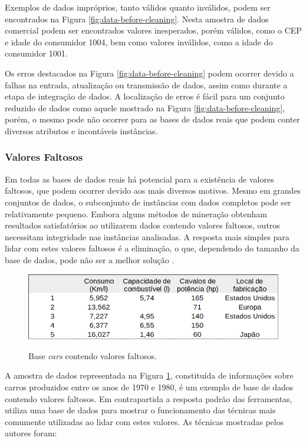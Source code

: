 Exemplos de dados impróprios, tanto válidos quanto inválidos, podem ser encontrados na Figura \ref{fig:data-before-cleaning}. Nesta amostra de dados comercial podem ser encontrados valores inesperados, porém válidos, como o CEP e idade do consumidor 1004, bem como valores inválidos, como a idade do consumidor 1001.

Os erros destacados na Figura \ref{fig:data-before-cleaning} podem ocorrer devido a falhas na entrada, atualização ou transmissão de dados, assim como durante a etapa de integração de dados. A localização de erros é fácil para um conjunto reduzido de dados como aquele mostrado na Figura \ref{fig:data-before-cleaning}, porém, o mesmo pode não ocorrer para as bases de dados reais que podem conter diversos atributos e incontáveis instâncias.

\subsubsection{Valores Faltosos}
\label{subsubsec:missing-values}

Em todas as bases de dados reais há potencial para a existência de valores faltosos, que podem ocorrer devido aos mais diversos motivos. Mesmo em grandes conjuntos de dados, o subconjunto de instâncias com dados completos pode ser relativamente pequeno. Embora alguns métodos de mineração obtenham resultados satisfatórios ao utilizarem dados contendo valores faltosos, outros necessitam integridade nas instâncias analisadas. A resposta mais simples para lidar com estes valores faltosos é a eliminação, o que, dependendo do tamanho da base de dados, pode não ser a melhor solução \cite{kantardzic2011data}.

\begin{figure}[H]
    \centering
    \caption{Base \textit{cars} contendo valores faltosos.}
    \includegraphics[width=\linewidth]{figuras/cars-missing-values.png}
    \label{fig:cars-missing-values}
\end{figure}

A amostra de dados representada na Figura \ref{fig:cars-missing-values}, constituída de informações sobre carros produzidos entre os anos de 1970 e 1980, é um exemplo de base de dados contendo valores faltosos. Em contrapartida a resposta padrão das ferramentas,  utiliza uma base de dados para mostrar o funcionamento das técnicas mais comumente utilizadas ao lidar com estes valores. As técnicas mostradas pelos autores foram:

